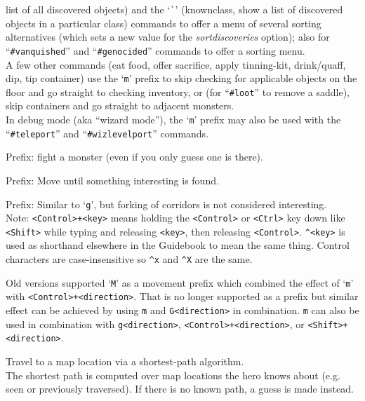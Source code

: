 \documentclass[titlepage]{article}
\begin{document}
\begin{description}[font=\mdseries\ttfamily]
list of all discovered objects) and the `\texttt{\`{}}' (knownclass,
show a list of discovered objects in a particular class) commands to offer
a menu of several sorting alternatives (which sets a new value for the
\textit{sortdiscoveries}
option); also for ``\texttt{\#vanquished}'' and ``\texttt{\#genocided}'' commands
to offer a sorting menu.
\\
A few other commands (eat food, offer sacrifice, apply tinning-kit,
drink/quaff, dip, tip container) use
the `\texttt{m}' prefix to skip checking for applicable objects on
the floor and go straight to checking inventory,
or (for ``\texttt{\#loot}'' to remove a saddle),
skip containers and go straight to adjacent monsters.
\\
In debug mode (aka ``wizard mode''), the `\texttt{m}' prefix may also be
used with the ``\texttt{\#teleport}'' and ``\texttt{\#wizlevelport}'' commands.
\item[F{[yuhjklbn]}]
Prefix:  fight a monster (even if you only guess one is there).
\item[g{[yuhjklbn]}]
Prefix:  Move until something interesting is found.
\item[G{[yuhjklbn]} \textrm{\textmd{or}} <Control>+{[yuhjklbn]}]
Prefix:  Similar to `\texttt{g}', but forking of corridors is not considered
interesting.
\\
Note:  \texttt{<Control>+<key>} means holding the \texttt{<Control>} or
\texttt{<Ctrl>} key down like \texttt{<Shift>} while typing and releasing
\texttt{<key>}, then releasing \texttt{<Control>}.  \texttt{\textasciicircum <key>} is used as
shorthand elsewhere in the Guidebook to mean the same thing.  Control
characters are case-insensitive so \texttt{\textasciicircum x} and \texttt{\textasciicircum X} are the same.
\item[M{[yuhjklbn]}]
Old versions supported `\texttt{M}' as a movement prefix which
combined the effect of `\texttt{m}' with \texttt{<Control>+<direction>}.
That is no longer supported as a prefix but similar effect can be achieved
by using \texttt{m} and \texttt{G<direction>} in combination.
\texttt{m} can also be used in combination with \texttt{g<direction>},
\texttt{<Control>+<direction>}, or \texttt{<Shift>+<direction>}.
\item[\textunderscore]
Travel to a map location via a shortest-path algorithm.\\
The shortest path
is computed over map locations the hero knows about (e.g. seen or
previously traversed).
If there is no known path, a guess is made instead.

\end{description}
\end{document}
